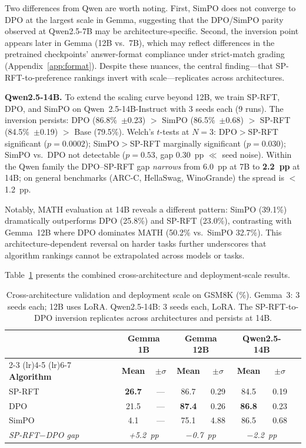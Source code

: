 \documentclass{article}
\newcommand{\sprft}{SP-RFT}
\begin{document}
Two differences from Qwen are worth noting. First, SimPO does not converge to DPO at the largest scale in Gemma, suggesting that the DPO/SimPO parity observed at Qwen2.5-7B may be architecture-specific. Second, the inversion point appears later in Gemma (12B vs.\ 7B), which may reflect differences in the pretrained checkpoints' answer-format compliance under strict-match grading (Appendix~\ref{app:format}). Despite these nuances, the central finding---that \sprft{}-to-preference rankings invert with scale---replicates across architectures.

\textbf{Qwen2.5-14B.} To extend the scaling curve beyond 12B, we train \sprft{}, DPO, and SimPO on Qwen~2.5-14B-Instruct with 3 seeds each (9 runs). The inversion persists: DPO (86.8\%~$\pm$0.23) $>$ SimPO (86.5\%~$\pm$0.68) $>$ \sprft{} (84.5\%~$\pm$0.19) $>$ Base (79.5\%). Welch's $t$-tests at $N{=}3$: DPO$>$\sprft{} significant ($p{=}0.0002$); SimPO$>$\sprft{} marginally significant ($p{=}0.030$); SimPO vs.\ DPO not detectable ($p{=}0.53$, gap $0.30$~pp $\ll$ seed noise). Within the Qwen family the DPO--\sprft{} gap \emph{narrows} from 6.0~pp at 7B to \textbf{2.2~pp} at 14B; on general benchmarks (ARC-C, HellaSwag, WinoGrande) the spread is $<$1.2~pp.

Notably, MATH evaluation at 14B reveals a different pattern: SimPO (39.1\%) dramatically outperforms DPO (25.8\%) and \sprft{} (23.0\%), contrasting with Gemma~12B where DPO dominates MATH (50.2\% vs.\ SimPO 32.7\%). This architecture-dependent reversal on harder tasks further underscores that algorithm rankings cannot be extrapolated across models or tasks.

Table~\ref{tab:cross_arch} presents the combined cross-architecture and deployment-scale results.

\begin{table}[t]
\centering
\caption{Cross-architecture validation and deployment scale on GSM8K (\%). Gemma~3: 3 seeds each; 12B uses LoRA. Qwen2.5-14B: 3 seeds each, LoRA. The \sprft{}-to-DPO inversion replicates across architectures and persists at 14B.}
\label{tab:cross_arch}
\small
\begin{tabular}{@{}lccccccc@{}}
\toprule
& \multicolumn{2}{c}{\textbf{Gemma 1B}} & \multicolumn{2}{c}{\textbf{Gemma 12B}} & \multicolumn{2}{c}{\textbf{Qwen2.5-14B}} \\
\cmidrule(lr){2-3} \cmidrule(lr){4-5} \cmidrule(lr){6-7}
\textbf{Algorithm} & \textbf{Mean} & \textbf{$\pm\sigma$} & \textbf{Mean} & \textbf{$\pm\sigma$} & \textbf{Mean} & \textbf{$\pm\sigma$} \\
\midrule
\sprft{} & \textbf{26.7} & --- & 86.7 & 0.29 & 84.5 & 0.19 \\
DPO & 21.5 & --- & \textbf{87.4} & 0.26 & \textbf{86.8} & 0.23 \\
SimPO & 4.1 & --- & 75.1 & 4.88 & 86.5 & 0.68 \\
\midrule
\textit{\sprft{}$-$DPO gap} & \multicolumn{2}{c}{\textit{+5.2~pp}} & \multicolumn{2}{c}{\textit{$-$0.7~pp}} & \multicolumn{2}{c}{\textit{$-$2.2~pp}} \\
\bottomrule
\end{tabular}
\end{table}
\end{document}
